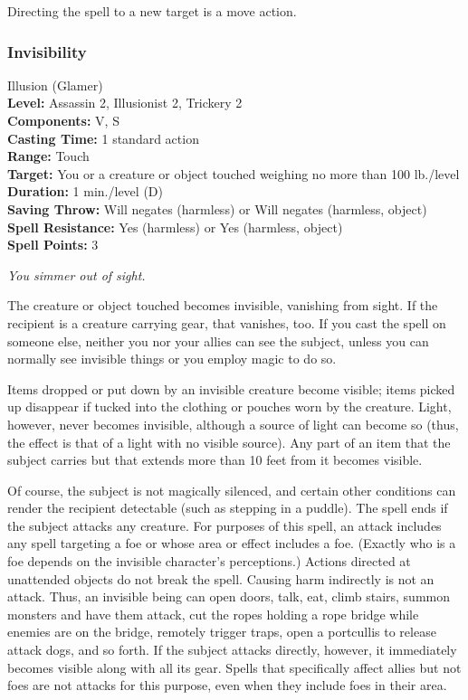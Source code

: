 Directing the spell to a new target is a move action.
\subsubsection{Invisibility}
\label{Spell:Invisibility}
Illusion (Glamer)
\\ \textbf{Level:} Assassin 2, Illusionist 2, Trickery 2
\\ \textbf{Components:} V, S
\\ \textbf{Casting Time:} 1 standard action
\\ \textbf{Range:} Touch
\\ \textbf{Target:} You or a creature or object touched weighing no more than 100 lb./level
\\ \textbf{Duration:} 1 min./level (D)
\\ \textbf{Saving Throw:} Will negates (harmless) or Will negates (harmless, object)
\\ \textbf{Spell Resistance:} Yes (harmless) or Yes (harmless, object)
\\ \textbf{Spell Points:} 3

\emph{You simmer out of sight.}

The creature or object touched becomes invisible, vanishing from sight. 
If the recipient is a creature carrying gear, that vanishes, too. 
If you cast the spell on someone else, neither you nor your allies can see the subject, 
unless you can normally see invisible things or you employ magic to do so.

Items dropped or put down by an invisible creature become visible; 
items picked up disappear if tucked into the clothing or pouches worn by the creature. 
Light, however, never becomes invisible, although a source of light can become so (thus, the effect is that of a light with no visible source). 
Any part of an item that the subject carries but that extends more than 10 feet from it becomes visible.

Of course, the subject is not magically silenced, and certain other conditions can render the recipient detectable (such as stepping in a puddle). 
The spell ends if the subject attacks any creature. 
For purposes of this spell, an attack includes any spell targeting a foe or whose area or effect includes a foe. 
(Exactly who is a foe depends on the invisible character's perceptions.) 
Actions directed at unattended objects do not break the spell. 
Causing harm indirectly is not an attack. 
Thus, an invisible being can open doors, talk, eat, climb stairs, summon monsters and have them attack, 
cut the ropes holding a rope bridge while enemies are on the bridge, remotely trigger traps, open a portcullis to release attack dogs, and so forth. 
If the subject attacks directly, however, it immediately becomes visible along with all its gear. 
Spells that specifically affect allies but not foes are not attacks for this purpose, even when they include foes in their area.

